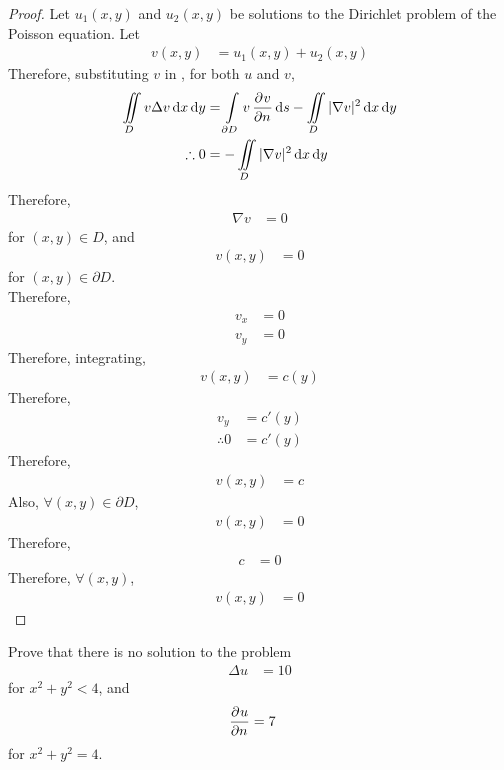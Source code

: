 \documentclass[titlepage, fleqn, a4paper, 12pt, twoside]{article}
\theoremstyle{definition}
\theoremstyle{theorem}
\begin{document}
\begin{proof}
	Let $u_1(x,y)$ and $u_2(x,y)$ be solutions to the Dirichlet problem of the Poisson equation.
	Let
	\begin{align*}
		v(x,y) & = u_1(x,y) + u_2(x,y)
	\end{align*}
	Therefore, substituting $v$ in , for both $u$ and $v$,
	\begin{align*}
		\iint\limits_{D} v \Delta v \dif x \dif y & = \int\limits_{\partial D} v \dpd{v}{n} \dif s - \iint\limits_{D} |\nabla v|^2 \dif x \dif y \\
		\therefore 0                              & = -\iint\limits_{D} |\nabla v|^2 \dif x \dif y
	\end{align*}
	Therefore,
	\begin{align*}
		\nabla v & = 0
	\end{align*}
	for $(x,y) \in D$, and
	\begin{align*}
		v(x,y) & = 0
	\end{align*}
	for $(x,y) \in \partial D$.\\
	Therefore,
	\begin{align*}
		v_x & = 0 \\
		v_y & = 0
	\end{align*}
	Therefore, integrating,
	\begin{align*}
		v(x,y) & = c(y)
	\end{align*}
	Therefore,
	\begin{align*}
		v_y          & = c'(y) \\
		\therefore 0 & = c'(y)
	\end{align*}
	Therefore,
	\begin{align*}
		v(x,y) & = c
	\end{align*}
	Also, $\forall (x,y) \in \partial D$,
	\begin{align*}
		v(x,y) & = 0
	\end{align*}
	Therefore,
	\begin{align*}
		c & = 0
	\end{align*}
	Therefore, $\forall (x,y)$,
	\begin{align*}
		v(x,y) & = 0
	\end{align*}
\end{proof}

\begin{question}
	Prove that there is no solution to the problem
	\begin{align*}
		\Delta u & = 10
	\end{align*}
	for $x^2 + y^2 < 4$, and
	\begin{align*}
		\dpd{u}{n} & = 7
	\end{align*}
	for $x^2 + y^2 = 4$.
\end{question}
\end{document}
